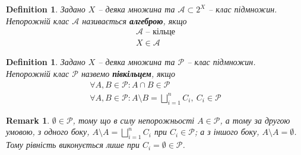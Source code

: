 \documentclass[a4paper, 10pt]{article}
\theoremstyle{theoremdd}
\newtheorem{definition}[theorem]{Definition}
\newtheorem{remark}[theorem]{Remark}
\begin{document}
\begin{definition}
Задано $X$ -- деяка множина та $\mathcal{A} \subset 2^X$ -- клас підмножин.\\
Непорожній клас $\mathcal{A}$ називається \textbf{алгеброю}, якщо
\begin{align*}
\mathcal{A} \text{ -- кільце} \\
X \in \mathcal{A}
\end{align*}
\end{definition}

\begin{definition}
Задано $X$ -- деяка множина та $\mathcal{P}$ -- клас підмножин.\\
Непорожній клас $\mathcal{P}$ назвемо \textbf{півкільцем}, якщо
\begin{align*}
\forall A,B \in \mathcal{P}: A \cap B \in \mathcal{P} \\
\forall A,B \in \mathcal{P}: A \setminus B = \bigsqcup_{i=1}^n C_i,\ C_i \in \mathcal{P}
\end{align*}
\end{definition}

\begin{remark}
$\emptyset \in \mathcal{P}$, тому що в силу непорожньості $A \in \mathcal{P}$, а тому за другою умовою, з одного боку, $A \setminus A = \displaystyle\bigsqcup_{i=1}^n C_i$ при $C_i \in \mathcal{P}$; а з іншого боку, $A \setminus A = \emptyset$. Тому рівність виконується лише при $C_i = \emptyset \in \mathcal{P}$.
\end{remark}
\end{document}
